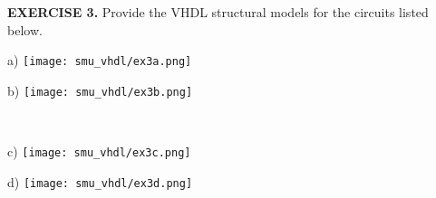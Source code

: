 \vspace{20pt}
\noindent
\begin{minipage}{\textwidth}
\textbf{EXERCISE 3.}
Provide the VHDL structural models for the circuits listed below.

\vspace{7pt}
\begin{minipage}[b]{0.45\linewidth}
\centering
a)
\texttt{[image: smu\_vhdl/ex3a.png]}
\end{minipage}
\hspace{0.2cm}
\begin{minipage}[b]{0.5\linewidth}
\centering
b)
\texttt{[image: smu\_vhdl/ex3b.png]}
\end{minipage}\\

\vspace{7pt}
\begin{minipage}[b]{0.45\linewidth}
\centering
c)
\texttt{[image: smu\_vhdl/ex3c.png]}
\end{minipage}
\hspace{0.2cm}
\begin{minipage}[b]{0.5\linewidth}
\centering
d)
\texttt{[image: smu\_vhdl/ex3d.png]}
\end{minipage}
\end{minipage}











